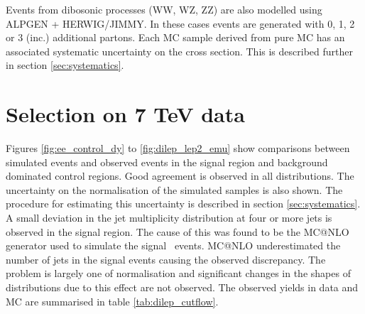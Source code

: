 Events from dibosonic processes (WW, WZ, ZZ) are also modelled using ALPGEN + HERWIG/JIMMY. In these cases events are generated with 0, 1, 2 or 3 (inc.) additional partons. Each MC sample derived from pure MC has an associated systematic uncertainty on the cross section. This is described further in section \ref{sec:systematics}.

\section{Selection on 7 TeV data}

Figures \ref{fig:ee_control_dy} to \ref{fig:dilep_lep2_emu} show comparisons between simulated events and observed events in the signal region and background dominated control regions. Good agreement is observed in all distributions. The uncertainty on the normalisation of the simulated samples is also shown. The procedure for estimating this uncertainty is described in section \ref{sec:systematics}. A small deviation in the jet multiplicity distribution at four or more jets is observed in the signal region. The cause of this was found to be the MC@NLO generator used to simulate the signal \ttbar\ events. MC@NLO underestimated the number of jets in the signal events causing the observed discrepancy. The problem is largely one of normalisation and significant changes in the shapes of distributions due to this effect are not observed. The observed yields in data and MC are summarised in table \ref{tab:dilep_cutflow}.

